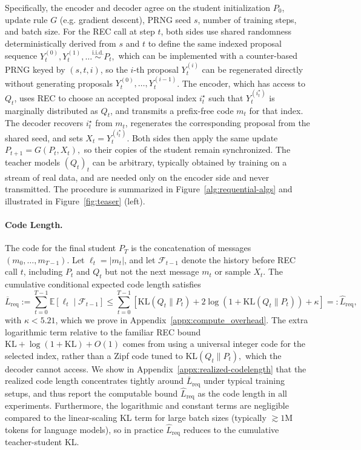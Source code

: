 \documentclass{article}
\theoremstyle{plain}
\theoremstyle{definition}
\theoremstyle{remark}
\begin{document}
Specifically, the encoder and decoder agree on the student initialization $P_0$, update rule $G$ (e.g. gradient descent), PRNG seed $s$, number of training steps, and batch size. For the REC call at step $t$, both sides use shared randomness deterministically derived from $s$ and $t$ to define the same indexed proposal sequence $Y_t^{(0)},Y_t^{(1)},\ldots \overset{\mathrm{i.i.d.}}{\sim} P_t,$ which can be implemented with a counter-based PRNG keyed by $(s,t,i)$, so the $i$-th proposal $Y_t^{(i)}$ can be regenerated directly without generating proposals $Y_t^{(0)},\ldots,Y_t^{(i-1)}$. The encoder, which has access to $Q_t$, uses REC to choose an accepted proposal index $i_t^\star$ such that $Y_t^{(i_t^\star)}$ is marginally distributed as $Q_t$, and transmits a prefix-free code $m_t$ for that index. The decoder recovers $i_t^\star$ from $m_t$, regenerates the corresponding proposal from the shared seed, and sets $X_t = Y_t^{(i_t^\star)}$.
Both sides then apply the same update
$P_{t+1}=G(P_t,X_t),$
so their copies of the student remain synchronized. The teacher models $(Q_t)_t$ can be arbitrary, typically obtained by training on a stream of real data, and are needed only on the encoder side and never transmitted. The procedure is summarized in Figure~\ref{alg:requential-algs} and illustrated in Figure~\ref{fig:teaser} (left).

\paragraph{Code Length.} The code for the final student $P_T$ is the concatenation of messages $(m_0, \ldots, m_{T-1})$. Let $\ell_t=|m_t|$, and let $\mathcal F_{t-1}$ denote the history before REC call $t$, including $P_t$ and $Q_t$ but not the next message $m_t$ or sample $X_t$. The cumulative conditional expected code length satisfies
\begin{equation}\label{eq:req_codelen}
\overline{L}_{\mathrm{req}}
:=
\sum_{t=0}^{T-1}\mathbb E[\ell_t\mid\mathcal F_{t-1}]
\le
\sum_{t=0}^{T-1}
\left[
\mathrm{KL}(Q_t\|P_t)
+
2\log(1+\mathrm{KL}(Q_t\|P_t))
+\kappa
\right]
=:
\widehat{L}_{\mathrm{req}},
\end{equation}
with $\kappa<5.21$, which we prove in Appendix~\ref{appx:compute_overhead}. The extra logarithmic term relative to the familiar REC bound $\mathrm{KL}+\log(1+\mathrm{KL})+O(1)$ comes from using a universal integer code for the selected index, rather than a Zipf code tuned to $\mathrm{KL}(Q_t\|P_t),$ which the decoder cannot access. We show in Appendix~\ref{appx:realized-codelength} that the realized code length concentrates tightly around $\overline{L}_{\mathrm{req}}$ under typical training setups, and thus report the computable bound $\widehat{L}_{\mathrm{req}}$ as the code length in all experiments. Furthermore, the logarithmic and constant terms are negligible compared to the linear-scaling KL term for large batch sizes (typically $\gtrsim 1$M tokens for language models), so in practice $\widehat{L}_{\mathrm{req}}$ reduces to the cumulative teacher-student KL.
\end{document}
